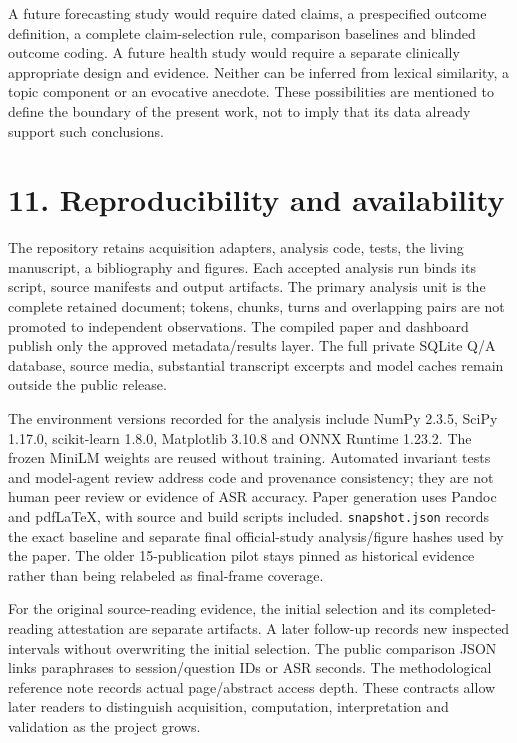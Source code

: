 \documentclass[
  11pt,
]{article}
\begin{document}
A future forecasting study would require dated claims, a prespecified
outcome definition, a complete claim-selection rule, comparison
baselines and blinded outcome coding. A future health study would
require a separate clinically appropriate design and evidence. Neither
can be inferred from lexical similarity, a topic component or an
evocative anecdote. These possibilities are mentioned to define the
boundary of the present work, not to imply that its data already support
such conclusions.

\FloatBarrier

\section{11. Reproducibility and
availability}\label{reproducibility-and-availability}

The repository retains acquisition adapters, analysis code, tests, the
living manuscript, a bibliography and figures. Each accepted analysis
run binds its script, source manifests and output artifacts. The primary
analysis unit is the complete retained document; tokens, chunks, turns
and overlapping pairs are not promoted to independent observations. The
compiled paper and dashboard publish only the approved metadata/results
layer. The full private SQLite Q/A database, source media, substantial
transcript excerpts and model caches remain outside the public release.

The environment versions recorded for the analysis include NumPy 2.3.5,
SciPy 1.17.0, scikit-learn 1.8.0, Matplotlib 3.10.8 and ONNX Runtime
1.23.2. The frozen MiniLM weights are reused without training. Automated
invariant tests and model-agent review address code and provenance
consistency; they are not human peer review or evidence of ASR accuracy.
Paper generation uses Pandoc and pdfLaTeX, with source and build scripts
included. \texttt{snapshot.json} records the exact baseline and separate
final official-study analysis/figure hashes used by the paper. The older
15-publication pilot stays pinned as historical evidence rather than
being relabeled as final-frame coverage.

For the original source-reading evidence, the initial selection and its
completed-reading attestation are separate artifacts. A later follow-up
records new inspected intervals without overwriting the initial
selection. The public comparison JSON links paraphrases to
session/question IDs or ASR seconds. The methodological reference note
records actual page/abstract access depth. These contracts allow later
readers to distinguish acquisition, computation, interpretation and
validation as the project grows.
\end{document}
